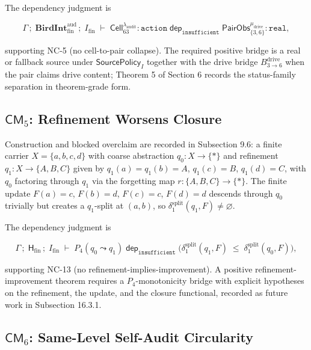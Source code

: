 \documentclass[11pt]{article}
\theoremstyle{definition}
\begin{document}
The dependency judgment is

\[
\Gamma\,;\;\mathbf{BirdInt}^{\mathrm{aud}}_{\mathrm{fin}}\,;\;I_{\mathrm{fin}}\;\vdash\;\mathsf{Cell}_{63}^{\lambda_{\mathrm{audit}}}:\texttt{action}\;\mathrel{\mathsf{dep}_{\texttt{insufficient}}}\;\mathsf{PairObs}_{\{3,6\}}^{\mu_{\mathrm{drive}}}:\texttt{real},
\]

supporting NC-5 (no cell-to-pair collapse). The required positive bridge is a real or fallback source under \(\mathsf{SourcePolicy}_I\) together with the drive bridge \(B_{3\to 6}^{\mathrm{drive}}\) when the pair claims drive content; Theorem 5 of Section 6 records the status-family separation in theorem-grade form.

\subsection{\texorpdfstring{\(\mathsf{CM}_5\): Refinement Worsens Closure}{C.6 \textbackslash mathsf\{CM\}\_5: Refinement Worsens Closure}}

Construction and blocked overclaim are recorded in Subsection 9.6: a finite carrier \(X=\{a,b,c,d\}\) with coarse abstraction \(q_0:X\to\{*\}\) and refinement \(q_1:X\to\{A,B,C\}\) given by \(q_1(a)=q_1(b)=A\), \(q_1(c)=B\), \(q_1(d)=C\), with \(q_0\) factoring through \(q_1\) via the forgetting map \(r:\{A,B,C\}\to\{*\}\). The finite update \(F(a)=c\), \(F(b)=d\), \(F(c)=c\), \(F(d)=d\) descends through \(q_0\) trivially but creates a \(q_1\)-split at \((a,b)\), so \(\delta_1^{\mathrm{split}}(q_1,F)\neq\varnothing\).

The dependency judgment is

\[
\Gamma\,;\;\mathsf H_{\mathrm{fin}}\,;\;I_{\mathrm{fin}}\;\vdash\;P_4(q_0\leadsto q_1)\;\mathrel{\mathsf{dep}_{\texttt{insufficient}}}\;\bigl(\delta_1^{\mathrm{split}}(q_1,F)\;\le\;\delta_1^{\mathrm{split}}(q_0,F)\bigr),
\]

supporting NC-13 (no refinement-implies-improvement). A positive refinement-improvement theorem requires a \(P_4\)-monotonicity bridge with explicit hypotheses on the refinement, the update, and the closure functional, recorded as future work in Subsection 16.3.1.

\subsection{\texorpdfstring{\(\mathsf{CM}_6\): Same-Level Self-Audit Circularity}{C.7 \textbackslash mathsf\{CM\}\_6: Same-Level Self-Audit Circularity}}
\end{document}
